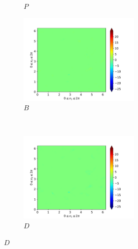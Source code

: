 \begin{figure}[H]
\begin{subfigure}{0.45\textwidth}
        \caption{$P$}
    \end{subfigure}
    \newline
    \begin{subfigure}{0.45\textwidth}
        \includegraphics[height=1.75in]{media/run-cds-65/B-ke-1380}
        \caption{$B$}
    \end{subfigure}
    ~
    \begin{subfigure}{0.45\textwidth}
        \includegraphics[height=1.75in]{media/run-cds-65/D-ke-1380}
        \caption{$D$}
    \end{subfigure}
\end{figure}

\newpage

